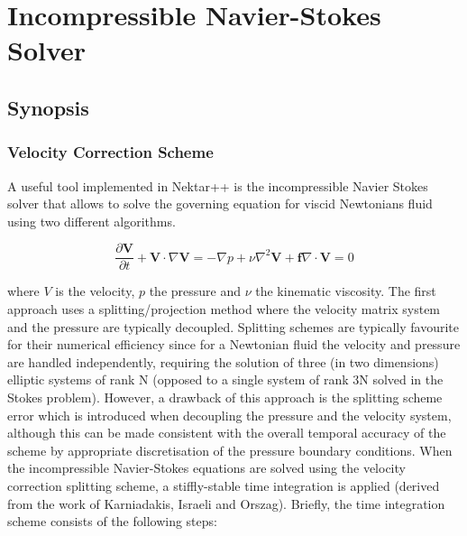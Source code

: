 \chapter{Incompressible Navier-Stokes Solver}
\label{IncNSsolver}

\section{Synopsis}
\subsection{Velocity Correction Scheme}
\label{VCSscheme}
A useful tool implemented in Nektar++ is the incompressible Navier Stokes solver that allows to solve the governing equation for viscid Newtonians fluid using two different algorithms.

\begin{subequations}
\begin{equation}
   \frac{\partial \mathbf{V}}{\partial t} + \mathbf{V} \cdot \nabla \mathbf{V} = -\nabla p + \nu \nabla^2 \mathbf{V} +  \mathbf{f}
 \end{equation}

 \begin{equation}
    \nabla \cdot \mathbf{V} = 0
    \end{equation}
 \end{subequations}

where $V$ is the velocity, $p$ the pressure and $\nu$ the kinematic viscosity. The first approach uses a splitting/projection method where the velocity matrix system and the pressure are typically decoupled. Splitting schemes are typically favourite for their numerical efficiency since for a Newtonian fluid the velocity and pressure are handled independently, requiring the solution of three (in two dimensions) elliptic systems of rank N (opposed to a single system of rank 3N solved in the Stokes problem). However, a drawback of this approach is the splitting scheme error which is introduced when decoupling the pressure and the velocity system, although this can be made consistent with the overall temporal accuracy of the scheme by appropriate discretisation of the pressure boundary conditions. When the incompressible Navier-Stokes equations are solved using the velocity correction splitting scheme, a stiffly-stable time integration is applied (derived from the work of Karniadakis, Israeli and Orszag).
 Briefly, the time integration scheme consists of the following steps:\\

